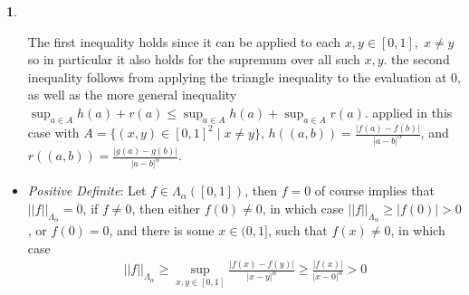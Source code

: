 \documentclass[10.5pt]{article}
\theoremstyle{definition}
\newtheorem{pb}{}
\newcommand{\set}[1]{\{#1\}}
\newcommand{\abs}[1]{\left\vert#1\right\vert}
\newcommand{\norm}[1]{\lvert\lvert#1\rvert\rvert}
\begin{document}
\begin{pb}
\begin{itemize}
                The first inequality holds since it can be applied to each \(x,y \in [0,1], \; x \neq y\) so in particular it also holds for the supremum over all such \(x,y\). the second inequality follows from applying the triangle inequality to the evaluation at 0, as well as the more general inequality \(\sup_{a \in A} h(a) + r(a) \leq \sup_{a \in A} h(a) + \sup_{a \in A} r(a)\). applied in this case with \(A = \set{(x,y) \in [0,1]^2 \mid x \neq y}\), \(h((a,b)) = \frac{\abs{f(a) - f(b)}}{\abs{a - b}^\alpha}\), and \(r((a,b)) = \frac{\abs{g(a) - g(b)}}{\abs{a - b}^\alpha}\).
                \item \emph{Positive Definite}: Let \(f \in \Lambda_\alpha([0,1])\), then \(f = 0\) of course implies that \(\norm{f}_{\Lambda_\alpha} = 0\), if \(f \neq 0\), then either \(f(0) \neq 0\), in which case \(\norm{f}_{\Lambda_\alpha} \geq \abs{f(0)} > 0\), or \(f(0) = 0\), and there is some \(x \in (0,1]\), such that \(f(x) \neq 0\), in which case
                \begin{align*}
                    \norm{f}_{\Lambda_\alpha} \geq \sup_{x,y \in [0,1]} \frac{\abs{f(x) - f(y)}}{\abs{x - y}^\alpha} \geq \frac{\abs{f(x)}}{\abs{x - 0}^\alpha} > 0
                \end{align*}
            \end{itemize}


\end{pb}
\end{document}
